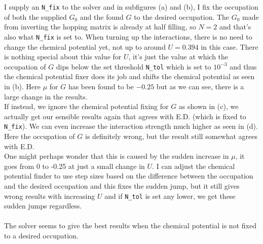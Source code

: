 \documentclass[12pt]{article}
\begin{document}
\newpage
\noindent
I supply an \texttt{N\_fix} to the solver and in subfigures (a) and (b), I fix the occupation of both the supplied $G_0$ and the found $G$ to the desired occupation. The $G_0$ made from inverting the hopping matrix is already at half filling, so $N=2$ and that's also what \texttt{N\_fix} is set to. When turning up the interactions, there is no need to change the chemical potential yet, not up to around $U=0.394$ in this case. There is nothing special about this value for $U$, it's just the value at which the occupation of $G$ dips below the set threshold \texttt{N\_tol} which is set to $10^{-3}$ and thus the chemical potential fixer does its job and shifts the chemical potential as seen in (b). Here $\mu$ for $G$ has been found to be $-0.25$ but as we can see, there is a large change in the results.\\
If instead, we ignore the chemical potential fixing for $G$ as shown in (c), we actually get our sensible results again that agrees with E.D. (which is fixed to \texttt{N\_fix}). We can even increase the interaction strength much higher as seen in (d). Here the occupation of $G$ is definitely wrong, but the result still somewhat agrees with E.D.\\
One might perhaps wonder that this is caused by the sudden increase in $\mu$, it goes from 0 to -0.25 at just a small change in $U$. I can adjust the chemical potential finder to use step sizes based on the difference between the occupation and the desired occupation and this fixes the sudden jump, but it still gives wrong results with increasing $U$ and if \texttt{N\_tol} is set any lower, we get these sudden jumps regardless.\\
\\
The solver seems to give the best results when the chemical potential is not fixed to a desired occupation. 
\end{document}
